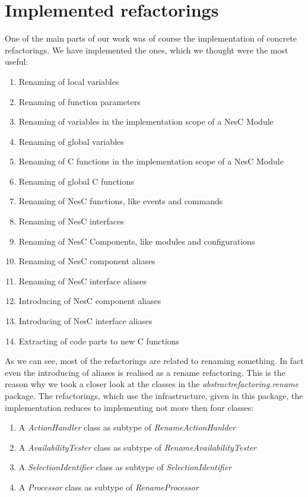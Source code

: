 \documentclass[a4paper,10pt]{report}
\begin{document}
\section{Implemented refactorings}
One of the main parts of our work was of course the implementation of concrete refactorings. We have implemented the ones, which we thought were the most useful:
   \begin{enumerate}
     \item Renaming of local variables
     \item Renaming of function parameters
     \item Renaming of variables in the implementation scope of a NesC Module
     \item Renaming of global variables
     \item Renaming of C functions in the implementation scope of a NesC Module 
     \item Renaming of global C functions
     \item Renaming of NesC functions, like events and commands
     \item Renaming of NesC interfaces
     \item Renaming of NesC Components, like modules and configurations
     \item Renaming of NesC component aliases
     \item Renaming of NesC interface aliases
     \item Introducing of NesC component aliases
     \item Introducing of NesC interface aliases
     \item Extracting of code parts to new C functions
   \end{enumerate}
As we can see, most of the refactorings are related to renaming something. In fact even the introducing of aliases is realised as a rename refactoring. This is the reason why we took a closer look at the classes in the {\it abstractrefactoring.rename} package. 
The refactorings, which use the infrastructure, given in this package, the implementation reduces to implementing not more then four classes:
   \begin{enumerate}
     \item A {\it ActionHandler} class as subtype of {\it RenameActionHanlder}
     \item A {\it AvailabilityTester} class as subtype of {\it RenameAvailabilityTester}
     \item A {\it SelectionIdentifier} class as subtype of {\it SelectionIdentifier}
     \item A {\it Processor} class as subtype of {\it RenameProcessor}
   \end{enumerate}
\end{document}
